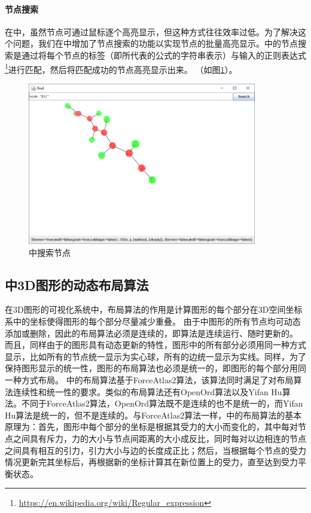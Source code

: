 \paragraph{节点搜索}
在中，虽然节点可通过鼠标逐个高亮显示，但这种方式往往效率过低。为了解决这个问题，我们在中增加了节点搜索的功能以实现节点的批量高亮显示。中的节点搜索是通过将每个节点的标签（即所代表的公式的字符串表示）与输入的正则表达式\footnote{\url{https://en.wikipedia.org/wiki/Regular_expression}}进行匹配，然后将匹配成功的节点高亮显示出来。
（如图\ref{vmdv:prooftree:search}）。
\begin{figure}
	\centering
	\includegraphics[width=10cm]{Img/vmdv_search.png}
	\caption{中搜索节点}
	\label{vmdv:prooftree:search}
\end{figure}

\subsection{中3D图形的动态布局算法}
在3D图形的可视化系统中，布局算法的作用是计算图形的每个部分在3D空间坐标系中的坐标使得图形的每个部分尽量减少重叠。
由于中图形的所有节点均可动态添加或删除，因此的布局算法必须是连续的，即算法是连续运行、随时更新的。
而且，同样由于的图形具有动态更新的特性，图形中的所有部分必须用同一种方式显示，比如所有的节点统一显示为实心球，所有的边统一显示为实线。同样，为了保持图形显示的统一性，图形的布局算法也必须是统一的，即图形的每个部分用同一种方式布局。
中的布局算法基于ForceAtlas2算法\cite{jacomy2014forceatlas2}，该算法同时满足了对布局算法连续性和统一性的要求。类似的布局算法还有OpenOrd算法\cite{martin2011openord}以及Yifan Hu算法\cite{yifanhu05}。不同于ForceAtlas2算法，OpenOrd算法既不是连续的也不是统一的，而Yifan Hu算法是统一的，但不是连续的。与ForceAtlas2算法一样，中的布局算法的基本原理为：首先，图形中每个部分的坐标是根据其受力的大小而变化的，其中每对节点之间具有斥力，力的大小与节点间距离的大小成反比，同时每对以边相连的节点之间具有相互的引力，引力大小与边的长度成正比；然后，当根据每个节点的受力情况更新完其坐标后，再根据新的坐标计算其在新位置上的受力，直至达到受力平衡状态。

